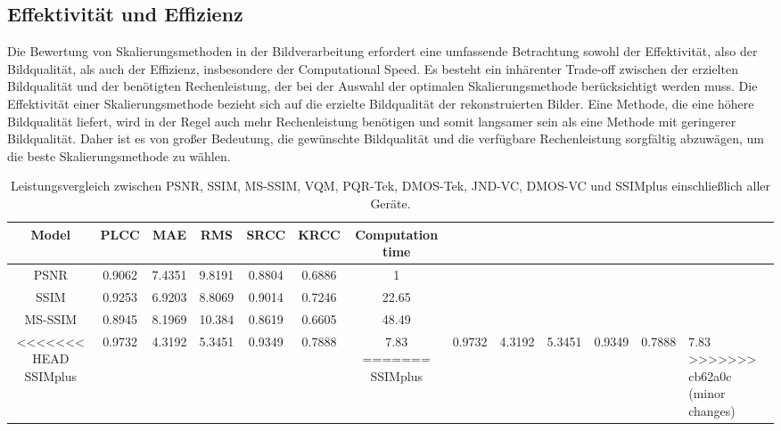     \subsection{Effektivität und Effizienz}

        Die Bewertung von Skalierungsmethoden in der Bildverarbeitung erfordert eine umfassende Betrachtung sowohl der Effektivität, also der Bildqualität, als auch der Effizienz, insbesondere der Computational Speed. 
        Es besteht ein inhärenter Trade-off zwischen der erzielten Bildqualität und der benötigten Rechenleistung, der bei der Auswahl der optimalen Skalierungsmethode berücksichtigt werden muss.
        Die Effektivität einer Skalierungsmethode bezieht sich auf die erzielte Bildqualität der rekonstruierten Bilder. 
        Eine Methode, die eine höhere Bildqualität liefert, wird in der Regel auch mehr Rechenleistung benötigen und somit langsamer sein als eine Methode mit geringerer Bildqualität. 
        Daher ist es von großer Bedeutung, die gewünschte Bildqualität und die verfügbare Rechenleistung sorgfältig abzuwägen, um die beste Skalierungsmethode zu wählen.


        \begin{table}[!h]
        \centering
        \begin{tabular}{ccccccc}
            \textbf{Model} & \textbf{PLCC} & \textbf{MAE} & \textbf{RMS} & \textbf{SRCC} & \textbf{KRCC} & \textbf{Computation time} \\ \hline
            PSNR           & 0.9062        & 7.4351       & 9.8191       & 0.8804        & 0.6886        & 1                                     \\
            SSIM           & 0.9253        & 6.9203       & 8.8069       & 0.9014        & 0.7246        & 22.65                                 \\
            MS-SSIM        & 0.8945        & 8.1969       & 10.384       & 0.8619        & 0.6605        & 48.49                                 \\
<<<<<<< HEAD
            SSIMplus       & 0.9732        & 4.3192       & 5.3451       & 0.9349        & 0.7888        & 7.83
=======
            SSIMplus       & 0.9732        & 4.3192       & 5.3451       & 0.9349        & 0.7888        & 7.83                                  
>>>>>>> cb62a0c (minor changes)
        \end{tabular}
        \caption{Leistungsvergleich zwischen PSNR, SSIM, MS-SSIM, VQM, PQR-Tek, DMOS-Tek, JND-VC,
DMOS-VC und SSIMplus einschließlich aller Geräte.}
        \label{tab:Leistungsvergleich}
        \end{table}


